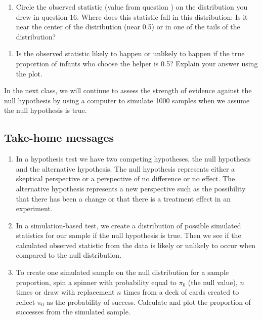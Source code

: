 \documentclass[
]{report}
\providecommand{\tightlist}{%
  \setlength{\itemsep}{0pt}\setlength{\parskip}{0pt}}
\begin{document}
\vspace{1.5in}

\begin{enumerate}
\def\labelenumi{\arabic{enumi}.}
\setcounter{enumi}{16}
\tightlist
\item
  Circle the observed statistic (value from question ) on the distribution you drew in question 16. Where does this statistic fall in this distribution: Is it near the center of the distribution (near 0.5) or in one of the tails of the distribution?
\end{enumerate}

\vspace{1in}

\begin{enumerate}
\def\labelenumi{\arabic{enumi}.}
\setcounter{enumi}{17}
\tightlist
\item
  Is the observed statistic likely to happen or unlikely to happen if the true proportion of infants who choose the helper is 0.5? Explain your answer using the plot.
\end{enumerate}

\vspace{0.8in}

In the next class, we will continue to assess the strength of evidence against the null hypothesis by using a computer to simulate 1000 samples when we assume the null hypothesis is true.

\hypertarget{take-home-messages-8}{%
\subsection{Take-home messages}\label{take-home-messages-8}}

\begin{enumerate}
\def\labelenumi{\arabic{enumi}.}
\item
  In a hypothesis test we have two competing hypotheses, the null hypothesis and the alternative hypothesis. The null hypothesis represents either a skeptical perspective or a perspective of no difference or no effect. The alternative hypothesis represents a new perspective such as the possibility that there has been a change or that there is a treatment effect in an experiment.
\item
  In a simulation-based test, we create a distribution of possible simulated statistics for our sample if the null hypothesis is true. Then we see if the calculated observed statistic from the data is likely or unlikely to occur when compared to the null distribution.
\item
  To create one simulated sample on the null distribution for a sample proportion, spin a spinner with probability equal to \(\pi_0\) (the null value), \(n\) times or draw with replacement \(n\) times from a deck of cards created to reflect \(\pi_0\) as the probability of success. Calculate and plot the proportion of successes from the simulated sample.
\end{enumerate}
\end{document}
